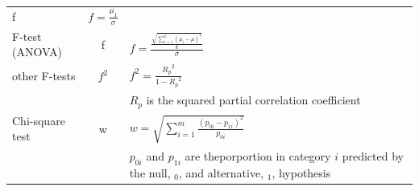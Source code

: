 \documentclass[
  12pt,
]{book}
\begin{document}
\begin{longtable}[]{@{}lcl@{}}
\begin{minipage}[t]{0.35\columnwidth}
f\strut
\end{minipage} & \begin{minipage}[t]{0.46\columnwidth}\raggedright
\(f = \frac{\mu_1}{\sigma}\)\strut
\end{minipage}\tabularnewline
\begin{minipage}[t]{0.11\columnwidth}\raggedright
F-test (ANOVA)\strut
\end{minipage} & \begin{minipage}[t]{0.35\columnwidth}\centering
f\strut
\end{minipage} & \begin{minipage}[t]{0.46\columnwidth}\raggedright
\(f = \frac{\frac{\sqrt{\sum_{i=1}^k (\mu_i - \mu)^2}}{k}}{\sigma}\)\strut
\end{minipage}\tabularnewline
\begin{minipage}[t]{0.11\columnwidth}\raggedright
other F-tests\strut
\end{minipage} & \begin{minipage}[t]{0.35\columnwidth}\centering
\(f^2\)\strut
\end{minipage} & \begin{minipage}[t]{0.46\columnwidth}\raggedright
\(f^2 = \frac{{R_p}^2}{1-{R_p}^2}\)\strut
\end{minipage}\tabularnewline
\begin{minipage}[t]{0.11\columnwidth}\raggedright
\strut
\end{minipage} & \begin{minipage}[t]{0.35\columnwidth}\centering
\strut
\end{minipage} & \begin{minipage}[t]{0.46\columnwidth}\raggedright
\({R_p}\) is the squared partial correlation coefficient\strut
\end{minipage}\tabularnewline
\begin{minipage}[t]{0.11\columnwidth}\raggedright
Chi-square test\strut
\end{minipage} & \begin{minipage}[t]{0.35\columnwidth}\centering
w\strut
\end{minipage} & \begin{minipage}[t]{0.46\columnwidth}\raggedright
\(w = \sqrt{ \sum_{i=1}^m \frac{(p_{0i} - p_{1i})^2 }{ p_{0i}} }\)\strut
\end{minipage}\tabularnewline
\begin{minipage}[t]{0.11\columnwidth}\raggedright
\strut
\end{minipage} & \begin{minipage}[t]{0.35\columnwidth}\centering
\strut
\end{minipage} & \begin{minipage}[t]{0.46\columnwidth}\raggedright
\(p_{0i}\) and \(p_{1i}\) are theporportion in category \(i\) predicted by the null, \(_0\), and alternative, \(_1\), hypothesis\strut
\end{minipage}\tabularnewline
\bottomrule
\end{longtable}
\end{document}

